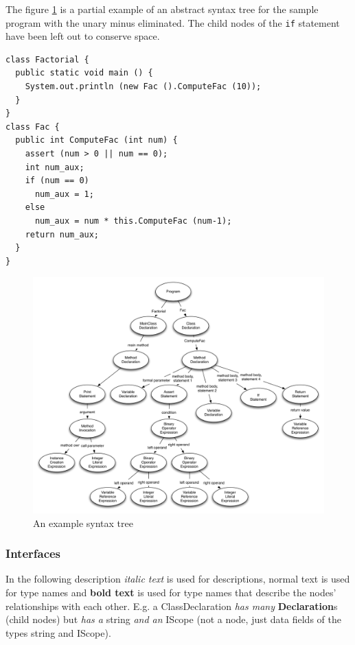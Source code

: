 \documentclass[a4paper,11pt]{article}
\begin{document}
The figure \ref{fig:ast} is a partial example of an abstract syntax tree for the sample program with the unary minus eliminated. The child nodes of the \verb,if, statement have been left out to conserve space.

\begin{verbatim}
class Factorial {
  public static void main () {
    System.out.println (new Fac ().ComputeFac (10));
  }
}
class Fac {
  public int ComputeFac (int num) {
    assert (num > 0 || num == 0);
    int num_aux;
    if (num == 0)
      num_aux = 1;
    else 
      num_aux = num * this.ComputeFac (num-1);
    return num_aux;
  }
}
\end{verbatim}

\begin{figure}[h!]
\centering
\includegraphics[width=1.0\textwidth]{syntaxtree.pdf}
\caption{An example syntax tree} \label{fig:ast}
\end{figure}

\subsubsection{Interfaces}

In the following description \emph{italic text} is used for descriptions, normal text is used for type names and \textbf{bold text} is used for type names that describe the nodes' relationships with each other. E.g. a ClassDeclaration \emph{has many} \textbf{Declaration}s (child nodes) but \emph{has a} string \emph{and an} IScope (not a node, just data fields of the types string and IScope).
\end{document}
